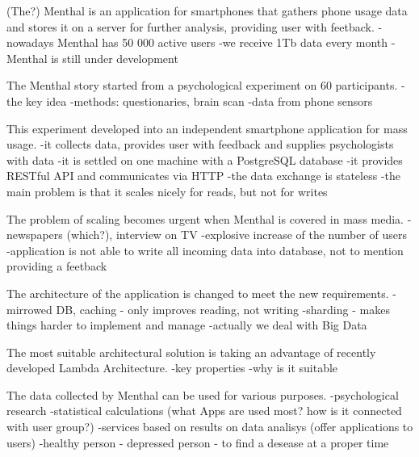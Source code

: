 (The?) Menthal is an application for smartphones that gathers phone usage data and stores it on a server for further analysis, providing user with feetback. 
-nowadays Menthal has 50 000 active users
-we receive 1Tb data every month
-Menthal is still under development

The Menthal story started from a psychological experiment on 60 participants.
-the key idea
-methods: questionaries, brain scan
-data from phone sensors

This experiment developed into an independent smartphone application for mass usage. 
-it collects data, provides user with feedback and supplies psychologists with data
-it is settled on one machine with a PostgreSQL database
-it provides RESTful API and communicates via HTTP
-the data exchange is stateless
-the main problem is that it scales nicely for reads, but not for writes

The problem of scaling becomes urgent when Menthal is covered in mass media.
-newspapers (which?), interview on TV
-explosive increase of the number of users
-application is not able to write all incoming data into database, not to mention providing a feetback 

The architecture of the application is changed to meet the new requirements.
-mirrowed DB, caching - only improves reading, not writing
-sharding - makes things harder to implement and manage
-actually we deal with Big Data

The most suitable architectural solution is taking an advantage of recently developed Lambda Architecture.
-key properties
-why is it suitable
 
The data collected by Menthal can be used for various purposes.
-psychological research
-statistical calculations (what Apps are used most? how is it connected with user group?)
-services based on results on data analisys (offer applications to users)
-healthy person - depressed person - to find a desease at a proper time